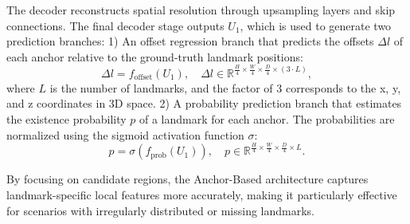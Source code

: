 The decoder reconstructs spatial resolution through upsampling layers and skip connections. The final decoder stage outputs \( U_1 \), which is used to generate two prediction branches:
1) An offset regression branch that predicts the offsets \( \Delta l \) of each anchor relative to the ground-truth landmark positions:
\begin{equation}
\Delta l = f_{\text{offset}}(U_1), \quad \Delta l \in \mathbb{R}^{\frac{H}{4} \times \frac{W}{4} \times \frac{D}{4} \times (3 \cdot L)},
\end{equation}
where \( L \) is the number of landmarks, and the factor of 3 corresponds to the x, y, and z coordinates in 3D space.
2) A probability prediction branch that estimates the existence probability \( p \) of a landmark for each anchor. The probabilities are normalized using the sigmoid activation function \( \sigma \):
\begin{equation}
p = \sigma(f_{\text{prob}}(U_1)), \quad p \in \mathbb{R}^{\frac{H}{4} \times \frac{W}{4} \times \frac{D}{4} \times L}.
\end{equation}





By focusing on candidate regions, the Anchor-Based architecture captures landmark-specific local features more accurately, making it particularly effective for scenarios with irregularly distributed or missing landmarks. 



